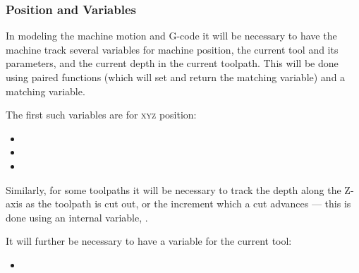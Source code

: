 \documentclass{ltxdoc}
\begin{document}


\subsubsection{Position and Variables}
 
In modeling the machine motion and G-code it will be necessary to have the machine track several variables for machine position, the current tool and its parameters, and the current depth in the current toolpath. This will be done using paired functions (which will set and return the  matching variable) and a matching variable.

\begin{samepage}
The first such variables are for \textsc{xyz} position:

\begin{itemize}
 \item {}
 \item {}
 \item {}
\end{itemize}
\end{samepage}

\noindent Similarly, for some toolpaths it will be necessary to track the depth along the Z-axis as the toolpath is cut out, or the increment which a cut advances --- this is done using an internal variable, .
% 

\begin{samepage}

It will further be necessary to have a variable for the current tool:

\begin{itemize}
 \item {}
\end{itemize}
\end{samepage}
\end{document}
